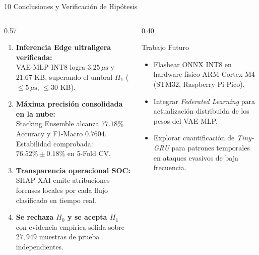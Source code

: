 \documentclass[aspectratio=169, 10pt]{beamer}
\begin{document}
\begin{frame}{10 \quad Conclusiones y Verificación de Hipótesis}
  \begin{columns}[T]
    \begin{column}{0.57\textwidth}
      \begin{enumerate}\small
        \item \textbf{Inferencia Edge ultraligera verificada:}\\
              VAE-MLP INT8 logra $3.25\,\mu\text{s}$ y $21.67$ KB,
              superando el umbral $H_1$ ($\leq 5\,\mu\text{s}$, $\leq 30$ KB).

        \item \textbf{Máxima precisión consolidada en la nube:}\\
              Stacking Ensemble alcanza $77.18\%$ Accuracy y F1-Macro $0.7604$.\\
              Estabilidad comprobada: $76.52\% \pm 0.18\%$ en 5-Fold CV.

        \item \textbf{Transparencia operacional SOC:}\\
              SHAP XAI emite atribuciones forenses locales por cada flujo
              clasificado en tiempo real.

        \vspace{4pt}
        \item[\textcolor{greensoft}{\checkmark}]
              \textbf{Se rechaza $H_0$ y se acepta $H_1$} con evidencia empírica
              sólida sobre $27{,}949$ muestras de prueba independientes.
      \end{enumerate}
    \end{column}

    \begin{column}{0.40\textwidth}
      \begin{block}{Trabajo Futuro}
        \begin{itemize}\small
          \item Flashear ONNX INT8 en hardware físico ARM Cortex-M4
                (STM32, Raspberry Pi Pico).
          \item Integrar \textit{Federated Learning} para actualización
                distribuida de los pesos del VAE-MLP.
          \item Explorar cuantificación de \textit{Tiny-GRU} para patrones
                temporales en ataques evasivos de baja frecuencia.
        \end{itemize}
      \end{block}
    \end{column}
  \end{columns}
\end{frame}
\end{document}

